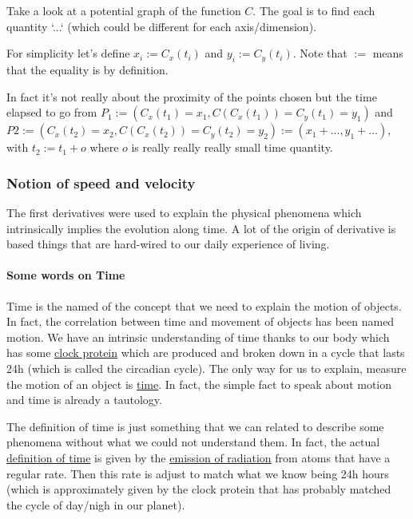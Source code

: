 \documentclass[12pt]{article}
\begin{document}
Take a look at a potential graph of the function $C$. The goal is to find each quantity `...` (which could be different for each axis/dimension).

\begin{figure}[H]
 \centering
 
\end{figure}

For simplicity let's define $x_i:=C_x(t_i)$ and $y_i:=C_y(t_i)$. Note that $:=$ means that the equality is by definition.

In fact it's not really about the proximity of the points chosen but the time elapsed to go from $P_1:=(C_x(t_1)=x_1, C(C_x(t_1))=C_y(t_1)=y_1)$ and $P2:=(C_x(t_2)=x_2, C(C_x(t_2))=C_y(t_2)=y_2) := (x_1+..., y_1+...)$, with $t_2 := t_1 + o$ where $o$ is really really really small time quantity. 

\subsubsection{Notion of speed and velocity}

The first derivatives were used to explain the physical phenomena which intrinsically implies the evolution along time. A lot of the origin of derivative is based things that are hard-wired to our daily experience of living.


\paragraph{Some words on Time}


Time is the named of the concept that we need to explain the motion of objects. In fact, the correlation between time and movement of objects has been named motion.
We have an intrinsic understanding of time thanks to our body which has some \href{https://kids.frontiersin.org/articles/10.3389/frym.2019.00005}{clock protein} which are  produced and broken down in a cycle that lasts 24h (which is called the circadian cycle). The only way for us to explain, measure the motion of an object is \href{https://iep.utm.edu/aristotle-motion/\#H3}{time}. In fact, the simple fact to speak about motion and time is already a tautology.

The definition of time is just something that we can related to describe some phenomena without what we could not understand them. In fact, the actual \href{https://www.nist.gov/how-do-you-measure-it/how-do-we-measure-time}{definition of time} is given by the \href{https://en.wikipedia.org/wiki/International_Atomic_Time}{emission of radiation} from atoms that have a regular rate. Then this rate is adjust to match what we know being 24h hours (which is approximately given by the clock protein that has probably matched the cycle of day/nigh in our planet).
\end{document}
